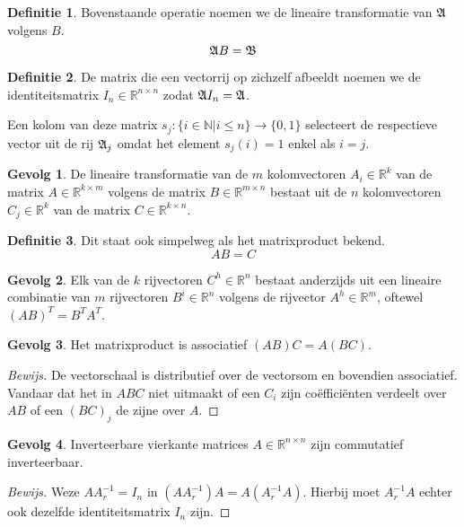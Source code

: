 \documentclass{amsart}
\theoremstyle{definition}
\newtheorem{dfn}{Definitie}[section]
\newtheorem{csq}{Gevolg}[section]
\newenvironment{bewijs}{\begin{proof}[Bewijs]}{\end{proof}}
\newcommand{\realnums}{\mathbb{R}}
\newcommand{\realn}[1][n]{\realnums^{#1}}
\newcommand{\realmx}[2][n]{\realn[#2 \times #1]}
\newcommand{\realnxn}{\realmx{n}}
\newcommand{\realmxn}{\realmx{m}}
\newcommand{\vecrow}[1][a]{\mathfrak{\MakeUppercase{#1}}}
\newcommand{\rvec}[2][i]{{#2}_{#1}}
\newcommand{\rvecr}[2][i]{\rvec[#1]{\vecrow[#2]}}
\newcommand{\rveci}[1][i]{\rvecr[#1]{a}}
\begin{document}
\begin{dfn}
    Bovenstaande operatie noemen we de lineaire transformatie van $\vecrow$ volgens $B$.
    \begin{equation*}
        \vecrow B = \vecrow[b]
    \end{equation*}
\end{dfn}

\begin{dfn}
    De matrix die een vectorrij op zichzelf afbeeldt noemen we de identiteitsmatrix $I_n \in \realnxn$ zodat $\vecrow I_n = \vecrow$.

    Een kolom van deze matrix $s_j: \{i \in \mathbb N|i\leq n\}\longrightarrow\{0,1\}$ selecteert de respectieve vector uit de rij $\rveci[j]$ omdat het element $s_j(i) = 1$ enkel als $i = j$.
\end{dfn}

\begin{csq}
    De lineaire transformatie van de $m$ kolomvectoren $A_i \in \realn[k]$ van de matrix $A \in \realmx[m]{k}$ volgens de matrix $B \in \realmxn$ bestaat uit de $n$ kolomvectoren $C_j \in \realn[k]$ van de matrix $C \in \realmx[n]{k}$.
\end{csq}

\begin{dfn}
    Dit staat ook simpelweg als het matrixproduct bekend.
    \begin{equation*}
        AB = C
    \end{equation*}
\end{dfn}

\begin{csq}
    Elk van de $k$ rijvectoren $C^h \in \realn$ bestaat anderzijds uit een lineaire combinatie van $m$ rijvectoren $B^i \in \realn$ volgens de rijvector $A^h \in \realn[m]$, oftewel $(AB)^T = B^TA^T$.
\end{csq}

\begin{csq}
    Het matrixproduct is associatief $(AB)C = A(BC)$.
    \begin{bewijs}
        De vectorschaal is distributief over de vectorsom en bovendien associatief.
        Vandaar dat het in $ABC$ niet uitmaakt of een $C_i$ zijn coëfficiënten verdeelt over $AB$ of een $(BC)_j$ de zijne over $A$.
    \end{bewijs}
\end{csq}

\begin{csq}
    Inverteerbare vierkante matrices $A \in \realnxn$ zijn commutatief inverteerbaar.
    \begin{bewijs}
        Weze $AA^{-1}_r = I_n$ in $(AA^{-1}_r)A = A(A^{-1}_rA)$. Hierbij moet $A^{-1}_rA$ echter ook dezelfde identiteitsmatrix $I_n$ zijn.
    \end{bewijs}
\end{csq}
\end{document}
